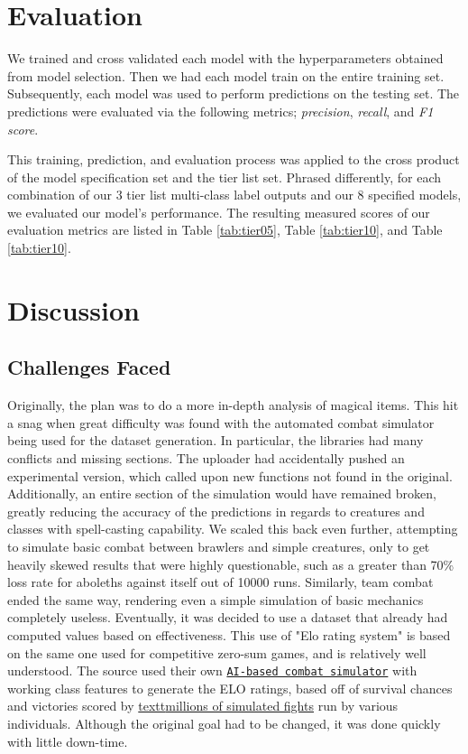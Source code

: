 \documentclass[12pt]{diazessay}
\begin{document}
\section{Evaluation}

We trained and cross validated each model with the hyperparameters obtained from model selection.
Then we had each model train on the entire training set.
Subsequently, each model was used to perform predictions on the testing set.
The predictions were evaluated via the following metrics; \emph{precision}, \emph{recall}, and \emph{F1 score}.

This training, prediction, and evaluation process was applied to the cross product of the model specification set and the tier list set.
Phrased differently, for each combination of our $3$ tier list multi-class label outputs and our $8$ specified models, we evaluated our model's performance.
The resulting measured scores of our evaluation metrics are listed in Table \ref{tab:tier05}, Table \ref{tab:tier10}, and Table \ref{tab:tier10}.


\section{Discussion}

\subsection{Challenges Faced}
\label{sec:challenges}

Originally, the plan was to do a more in-depth analysis of magical items. This hit a snag when great difficulty was found with the automated combat simulator being used for the dataset generation. In particular, the libraries had many conflicts and missing sections. The uploader had accidentally pushed an experimental version, which called upon new functions not found in the original. Additionally, an entire section of the simulation would have remained broken, greatly reducing the accuracy of the predictions in regards to creatures and classes with spell-casting capability. We scaled this back even further, attempting to simulate basic combat between brawlers and simple creatures, only to get heavily skewed results that were highly questionable, such as a greater than 70\% loss rate for aboleths against itself out of 10000 runs. Similarly, team combat ended the same way, rendering even a simple simulation of basic mechanics completely useless.
\newline
Eventually, it was decided to use a dataset that already had computed values based on effectiveness. This use of "Elo rating system" is based on the same one used for competitive zero-sum games, and is relatively well understood. The source used their own \href{https://www.dndcombat.com/dndcombat/Welcome.do}{\texttt{AI-based combat simulator}} with working class features to generate the ELO ratings, based off of survival chances and victories scored by \href{https://www.dndcombat.com/code_updates.html?v=3.51}{textt{millions of simulated fights}} run by various individuals. Although the original goal had to be changed, it was done quickly with little down-time.
\newline
\end{document}

